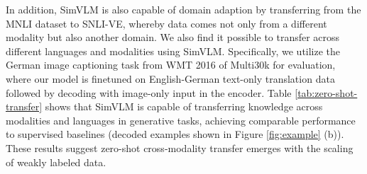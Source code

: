 \documentclass{article} \usepackage{iclr2022_conference,times}
\newcommand{\ours}{SimVLM}
\begin{document}
In addition, {\ours} is also capable of domain adaption by transferring from the MNLI dataset to SNLI-VE, whereby data comes not only from a different modality but also another domain. We also find it possible to transfer across different languages and modalities using {\ours}.
Specifically, we utilize the German image captioning task from WMT 2016 of Multi30k for evaluation, where our model is finetuned on English-German text-only translation data followed by decoding with image-only input in the encoder. Table \ref{tab:zero-shot-transfer} shows that {\ours} is capable of transferring knowledge across modalities and languages in generative tasks,
achieving comparable performance to supervised baselines (decoded examples shown in Figure \ref{fig:example} (b)). These results suggest zero-shot cross-modality transfer emerges with the scaling of weakly labeled data.

\begin{table*}[t!]
\begin{center}
\end{center}
\caption[caption]{Zero-shot cross-modality transfer results on SNLI-VE and Multi30k. For SNLI-VE, the zero-shot model is finetuned on three source datasets: text-only SNLI-VE \citep{xie2019visual}, SNLI \citep{bowman2015large}, and MNLI \citep{williams2017broad}. For Multi30k, the model is finetuned on text-only Multi30k data. Model reference: \citep{specia2016shared}.} 
\label{tab:zero-shot-transfer}
\vskip -0.1in
\end{table*}
\end{document}

